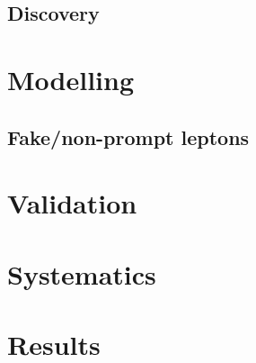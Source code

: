 \subsection{Discovery}

\section{Modelling}

\subsection{Fake/non-prompt leptons}

\section{Validation}

\section{Systematics}

\section{Results}


